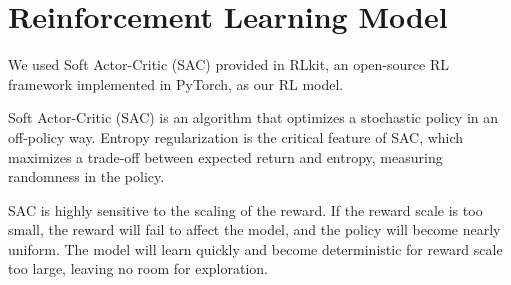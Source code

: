 \section{Reinforcement Learning Model}
We used Soft Actor-Critic (SAC) \cite{haarnoja2018soft} provided in RLkit, an open-source RL framework implemented in PyTorch\cite{pongrlkit}, as our RL model.
\par
Soft Actor-Critic (SAC) is an algorithm that optimizes a stochastic policy in an off-policy way.
Entropy regularization is the critical feature of SAC, which maximizes a trade-off between expected return and entropy, measuring randomness in the policy.
\par
SAC is highly sensitive to the scaling of the reward. If the reward scale is too small, the reward will fail to affect the model, and the policy will become nearly uniform. The model will learn quickly and become deterministic for reward scale too large, leaving no room for exploration.